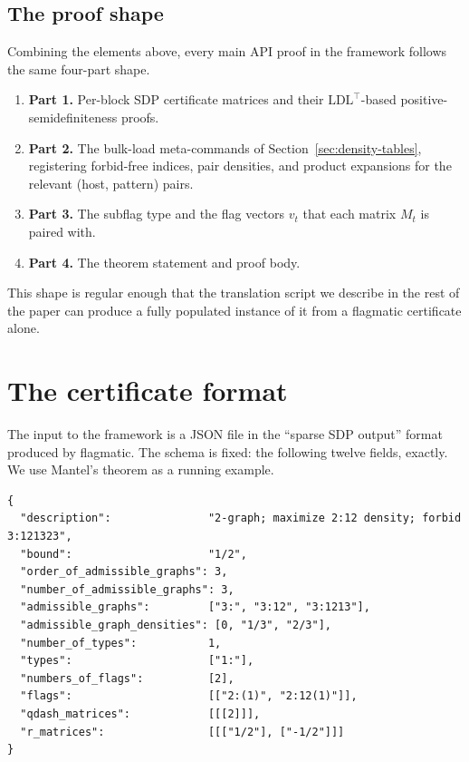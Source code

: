 \documentclass[11pt]{article}
\begin{document}
\subsection{The proof shape}
\label{sec:proof-shape}

Combining the elements above, every main API proof in the framework
follows the same four-part shape.
\begin{enumerate}
  \item \textbf{Part 1.} Per-block SDP certificate matrices and their
    $\mathrm{LDL}^\top$-based positive-semidefiniteness proofs.
  \item \textbf{Part 2.} The bulk-load meta-commands of
    Section~\ref{sec:density-tables}, registering forbid-free indices,
    pair densities, and product expansions for the relevant
    (host, pattern) pairs.
  \item \textbf{Part 3.} The subflag type and the flag vectors $v_t$ that
    each matrix $M_t$ is paired with.
  \item \textbf{Part 4.} The theorem statement and proof body.
\end{enumerate}
This shape is regular enough that the translation script we describe in
the rest of the paper can produce a fully populated instance of it from
a flagmatic certificate alone.

\section{The certificate format}
\label{sec:format}

The input to the framework is a JSON file in the ``sparse SDP output''
format produced by flagmatic. The schema is fixed: the
following twelve fields, exactly. We use Mantel's theorem as a running
example.

\begin{lstlisting}[language={}]
{
  "description":               "2-graph; maximize 2:12 density; forbid 3:121323",
  "bound":                     "1/2",
  "order_of_admissible_graphs": 3,
  "number_of_admissible_graphs": 3,
  "admissible_graphs":         ["3:", "3:12", "3:1213"],
  "admissible_graph_densities": [0, "1/3", "2/3"],
  "number_of_types":           1,
  "types":                     ["1:"],
  "numbers_of_flags":          [2],
  "flags":                     [["2:(1)", "2:12(1)"]],
  "qdash_matrices":            [[[2]]],
  "r_matrices":                [[["1/2"], ["-1/2"]]]
}
\end{lstlisting}
\end{document}
